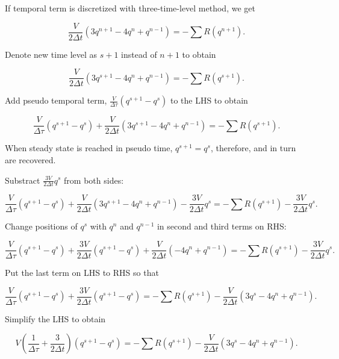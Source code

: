 \documentclass{report}
\begin{document}
If temporal term is discretized with three-time-level method, we get

\begin{equation}\label{eq:original}
    \frac{V}{2\Delta t} (3q^{n+1}-4q^n+q^{n-1}) = -\sum R(q^{n+1}).
\end{equation}

Denote new time level as $s+1$ instead of $n+1$ to obtain

\begin{equation}\label{eq:denote}
    \frac{V}{2\Delta t} (3q^{s+1}-4q^n+q^{n-1}) = -\sum R(q^{s+1}).
\end{equation}

Add pseudo temporal term, $\frac{V}{\Delta \tau} (q^{s+1}-q^s)$ to the LHS to obtain

\begin{equation}
    \frac{V}{\Delta \tau} (q^{s+1}-q^s) + \frac{V}{2\Delta t} (3q^{s+1}-4q^n+q^{n-1}) = -\sum R(q^{s+1}).
\end{equation}

When steady state is reached in pseudo time, $q^{s+1}=q^s$, therefore,  and in turn  are recovered. 

Substract $\frac{3V}{2\Delta t} q^s$ from both sides:

\begin{equation}
    \frac{V}{\Delta \tau} (q^{s+1}-q^s) + \frac{V}{2\Delta t} (3q^{s+1}-4q^n+q^{n-1}) - \frac{3V}{2\Delta t} q^s = -\sum R(q^{s+1}) - \frac{3V}{2\Delta t} q^s.
\end{equation}

Change positions of $q^s$ with $q^n$ and $q^{n-1}$ in second and third terms on RHS:

\begin{equation}
    \frac{V}{\Delta \tau} (q^{s+1}-q^s) + \frac{3V}{2\Delta t} (q^{s+1}-q^s) + \frac{V}{2\Delta t} (-4q^n+q^{n-1}) = -\sum R(q^{s+1}) - \frac{3V}{2\Delta t} q^s.
\end{equation}

Put the last term on LHS to RHS so that

\begin{equation}
    \frac{V}{\Delta \tau} (q^{s+1}-q^s) + \frac{3V}{2\Delta t} (q^{s+1}-q^s) = -\sum R(q^{s+1}) - \frac{V}{2\Delta t} (3q^s-4q^n+q^{n-1}).
\end{equation}

Simplify the LHS to obtain

\begin{equation}
    V\left(\frac{1}{\Delta \tau}+\frac{3}{2\Delta t}\right)(q^{s+1}-q^s) = -\sum R(q^{s+1}) - \frac{V}{2\Delta t} (3q^s-4q^n+q^{n-1}).
\end{equation}
\end{document}
